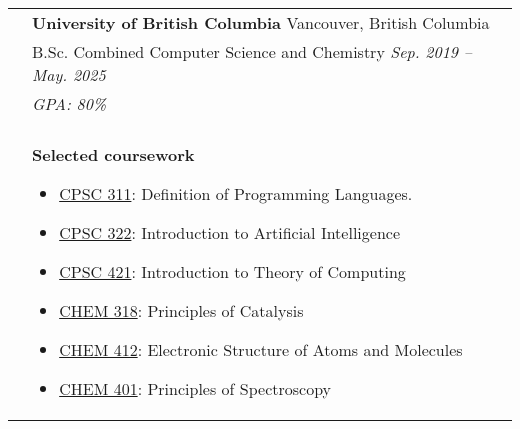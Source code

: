 \documentclass[letterpaper, 11pt]{article}
\begin{document}
\begin{longtable}{p{1.3in}p{4.8in}}
	\color{Blue}{Education}
	 & \textbf{University of British Columbia} \hfill Vancouver, British Columbia                                                                                                                                                                                                                                                                                                                \\
	 & B.Sc. Combined Computer Science and Chemistry \hfill \textit{Sep. 2019 -- May. 2025}                                                                                                                                                                                                                                                                                                      \\
	 & {\it GPA: 80\%}                                                                                                                                                                                                                                                                                                                                                                           \\
	 &                                                                                                                                                                                                                                                                                                                                                                                           \\

	 & \textbf{Selected coursework}
	\begin{itemize}[noitemsep,leftmargin=*]
		\item \underline{CPSC 311}: Definition of Programming Languages.
		\item \underline{CPSC 322}: Introduction to Artificial Intelligence
		\item \underline{CPSC 421}: Introduction to Theory of Computing
		\item \underline{CHEM 318}: Principles of Catalysis
		\item \underline{CHEM 412}: Electronic Structure of Atoms and Molecules
		\item \underline{CHEM 401}: Principles of Spectroscopy
	\end{itemize}                                                                                                                                                                                                                                                                                                                       \\


\end{longtable}
\end{document}
